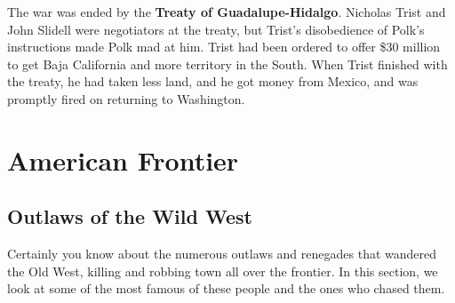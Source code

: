 The war was ended by the \textbf{Treaty of Guadalupe-Hidalgo}.
Nicholas Trist and John Slidell were negotiators at the treaty,
but Trist's disobedience of Polk's instructions made Polk mad at him.
Trist had been ordered to offer \$30 million to get Baja California and more territory in the South.
When Trist finished with the treaty, he had taken less land, and he got money from Mexico,
and was promptly fired on returning to Washington.

\section{American Frontier}

\subsection*{Outlaws of the Wild West}

Certainly you know about the numerous outlaws and renegades that wandered the Old West,
killing and robbing town all over the frontier.
In this section, we look at some of the most famous of these people and the ones who chased them.

